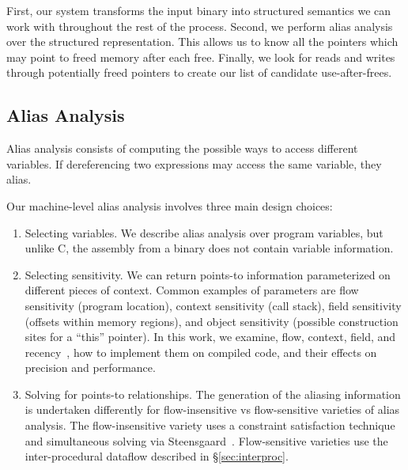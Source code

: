 \label{alias:sec:system}
First, our system transforms the input binary into structured
semantics we can work with throughout the rest of the process.
Second, we perform alias analysis over the structured representation.
This allows us to know all the pointers which may point to freed
memory after each free.  Finally, we look for reads and writes through
potentially freed pointers to create our list of candidate
use-after-frees.

\subsection{Alias Analysis}
Alias analysis consists of computing the possible ways to access different variables.
If dereferencing two expressions may access the same variable, they alias.

Our machine-level alias analysis involves three main design choices:
\begin{enumerate}
\item Selecting variables.
  We describe alias analysis over program variables, but unlike C, the assembly from a binary does not contain variable information.
\item Selecting sensitivity.
  We can return points-to information parameterized on different pieces of context.
  Common examples of parameters are flow sensitivity (program location), context sensitivity (call stack), field sensitivity (offsets within memory regions), and object sensitivity (possible construction sites for a ``this'' pointer).
  In this work, we examine, flow, context, field, and recency~\cite{vsa}, how to implement them on compiled code, and their effects on precision and performance.
\item Solving for points-to relationships.
  The generation of the aliasing information is undertaken differently for flow-insensitive vs flow-sensitive varieties of alias analysis.
  The flow-insensitive variety uses a constraint satisfaction technique and simultaneous solving via Steensgaard~\cite{steensgaard-alias}.
  Flow-sensitive varieties use the inter-procedural dataflow described in \S \ref{sec:interproc}.
\end{enumerate}

